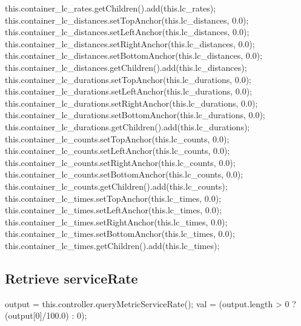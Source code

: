 this.container_lc_rates.getChildren().add(this.lc_rates);
this.container_lc_distances.setTopAnchor(this.lc_distances, 0.0);
this.container_lc_distances.setLeftAnchor(this.lc_distances, 0.0);
this.container_lc_distances.setRightAnchor(this.lc_distances, 0.0);
this.container_lc_distances.setBottomAnchor(this.lc_distances, 0.0);
this.container_lc_distances.getChildren().add(this.lc_distances);
this.container_lc_durations.setTopAnchor(this.lc_durations, 0.0);
this.container_lc_durations.setLeftAnchor(this.lc_durations, 0.0);
this.container_lc_durations.setRightAnchor(this.lc_durations, 0.0);
this.container_lc_durations.setBottomAnchor(this.lc_durations, 0.0);
this.container_lc_durations.getChildren().add(this.lc_durations);
this.container_lc_counts.setTopAnchor(this.lc_counts, 0.0);
this.container_lc_counts.setLeftAnchor(this.lc_counts, 0.0);
this.container_lc_counts.setRightAnchor(this.lc_counts, 0.0);
this.container_lc_counts.setBottomAnchor(this.lc_counts, 0.0);
this.container_lc_counts.getChildren().add(this.lc_counts);
this.container_lc_times.setTopAnchor(this.lc_times, 0.0);
this.container_lc_times.setLeftAnchor(this.lc_times, 0.0);
this.container_lc_times.setRightAnchor(this.lc_times, 0.0);
this.container_lc_times.setBottomAnchor(this.lc_times, 0.0);
this.container_lc_times.getChildren().add(this.lc_times);
\nwendcode{}\nwdocspar

\subsection{Retrieve serviceRate}
\nwenddocs{}\endmoddef{}
output = this.controller.queryMetricServiceRate();
val = (output.length > 0 ? (output[0]/100.0) : 0);
\nwendcode{}\nwdocspar

